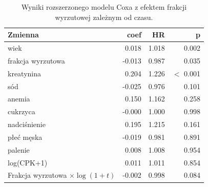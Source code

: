\begin{table}[htbp]
\centering
\caption{Wyniki rozszerzonego modelu Coxa z efektem frakcji wyrzutowej zależnym od czasu.}
\label{tab:cox-time-results}
\scriptsize
\setlength{\tabcolsep}{1.5pt}
\begin{tabular}{lrrr}
\toprule
Zmienna & coef & HR & p \\
\midrule
wiek & 0.018 & 1.018 & 0.002 \\
frakcja wyrzutowa & -0.013 & 0.987 & 0.035 \\
kreatynina & 0.204 & 1.226 & $<$ 0.001 \\
sód & -0.025 & 0.976 & 0.101 \\
anemia & 0.150 & 1.162 & 0.258 \\
cukrzyca & -0.000 & 1.000 & 0.998 \\
nadciśnienie & 0.195 & 1.215 & 0.161 \\
płeć męska & -0.019 & 0.981 & 0.891 \\
palenie & 0.008 & 1.008 & 0.954 \\
log(CPK+1) & 0.011 & 1.011 & 0.854 \\
Frakcja wyrzutowa $\times \log(1+t)$ & -0.002 & 0.998 & 0.084 \\
\bottomrule
\end{tabular}
\end{table}
